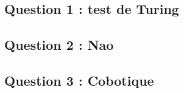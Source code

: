 \subsection{Question 1 : test de Turing}

\subsection{Question 2 : Nao}

\subsection{Question 3 : Cobotique}
